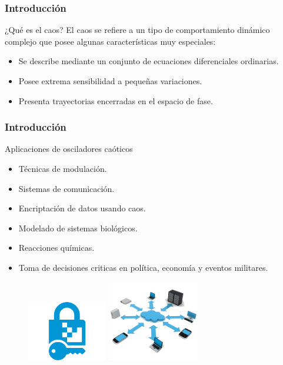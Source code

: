\documentclass[10pt]{beamer}
\begin{document}
	\begin{frame}
		\frametitle{Introducción}
		\begin{block}{¿Qué es el caos?}
		\justifying
			El caos se refiere a un tipo de comportamiento dinámico complejo que posee algunas características muy especiales:
			\begin{itemize}
				\item Se describe mediante un conjunto de ecuaciones diferenciales ordinarias.
				\item Posee extrema sensibilidad a pequeñas variaciones.
				\item Presenta trayectorias encerradas en el espacio de fase.
			\end{itemize}
		\end{block}
	\end{frame}	
	
	
		\begin{frame}
		\frametitle{Introducción}
		\begin{block}{Aplicaciones de osciladores caóticos}
			\begin{itemize}
				\item Técnicas de modulación.
				\item Sistemas de comunicación.
				\item Encriptación de datos usando caos.
				\item Modelado de sistemas biológicos.
				\item Reacciones químicas.
				\item Toma de decisiones criticas en política, economía y eventos militares.
				\end{itemize}
		\end{block}

\begin{figure}[!h]
	\begin{minipage}[c]{0.45\textwidth}
		\centering
		\includegraphics[width = 3.5cm]{encrypt.png}
	\end{minipage} \hfill \begin{minipage}[c]{0.45\textwidth}
		\centering
		\includegraphics[width = 4cm]{comunication.png}
	\end{minipage}
\end{figure}
	\end{frame}
	
\end{document}
